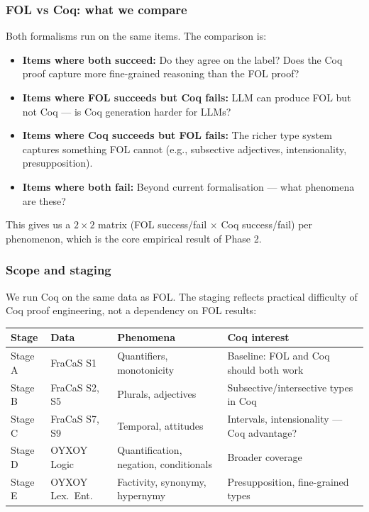 \documentclass[11pt,a4paper]{article}
\begin{document}
\subsubsection{FOL vs Coq: what we compare}

Both formalisms run on the same items. The comparison is:

\begin{itemize}[nosep,leftmargin=1.5em]
\item \textbf{Items where both succeed:} Do they agree on the label? Does the Coq proof capture more fine-grained reasoning than the FOL proof?
\item \textbf{Items where FOL succeeds but Coq fails:} LLM can produce FOL but not Coq --- is Coq generation harder for LLMs?
\item \textbf{Items where Coq succeeds but FOL fails:} The richer type system captures something FOL cannot (e.g., subsective adjectives, intensionality, presupposition).
\item \textbf{Items where both fail:} Beyond current formalisation --- what phenomena are these?
\end{itemize}

This gives us a $2 \times 2$ matrix (FOL success/fail $\times$ Coq success/fail) per phenomenon, which is the core empirical result of Phase 2.

\subsubsection{Scope and staging}

We run Coq on the same data as FOL. The staging reflects practical difficulty of Coq proof engineering, not a dependency on FOL results:

\begin{table}[h!]
\centering\small
\begin{tabular}{l l l l}
\toprule
\textbf{Stage} & \textbf{Data} & \textbf{Phenomena} & \textbf{Coq interest} \\
\midrule
Stage A & FraCaS S1 & Quantifiers, monotonicity & Baseline: FOL and Coq should both work \\
Stage B & FraCaS S2, S5 & Plurals, adjectives & Subsective/intersective types in Coq \\
Stage C & FraCaS S7, S9 & Temporal, attitudes & Intervals, intensionality --- Coq advantage? \\
Stage D & OYXOY Logic & Quantification, negation, conditionals & Broader coverage \\
Stage E & OYXOY Lex.\ Ent. & Factivity, synonymy, hypernymy & Presupposition, fine-grained types \\
\bottomrule
\end{tabular}
\end{table}
\end{document}
